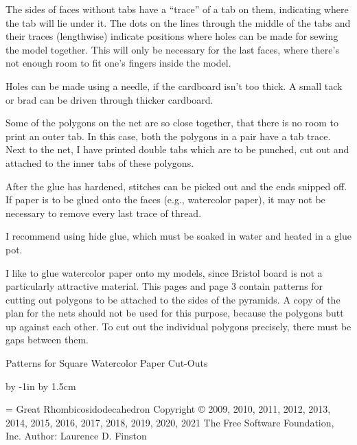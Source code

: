 The sides of faces without tabs have a ``trace'' of a tab on them,
indicating where the tab will lie under it.  The dots on the lines
through the middle of the tabs and their traces (lengthwise) indicate
positions where holes can be made for sewing the model together.  This
will only be necessary for the last faces, where there's not enough
room to fit one's fingers inside the model.  

Holes can be made using a needle, if the cardboard isn't too thick.
A small tack or brad can be driven through thicker cardboard.

Some of the polygons on the net are so close together, that there is no room
to print an outer tab.  In this case, both the polygons in a pair have a 
tab trace.  Next to the net, I have printed double tabs which are to be
punched, cut out and attached to the inner tabs of these polygons.

After the glue has hardened, stitches can be picked out and the ends
snipped off.  If paper is to be glued onto the faces (e.g., watercolor
paper), it may not be necessary to remove every last trace of thread.

I recommend using hide glue, which must be soaked in water and heated
in a glue pot.

I like to glue watercolor paper onto my models, since Bristol board is
not a particularly attractive material.  This pages and page 3 contain 
patterns for cutting out polygons to be attached to the sides of the pyramids.
A copy of the plan for the nets should not be used for this purpose, because
the polygons butt up against each other.  To cut out the individual 
polygons precisely, there must be gaps between them.
\par
\endgroup

\baselineskip
\centerline{{\largebx Patterns for Square Watercolor Paper Cut-Outs}}
\baselineskip
{}

\vfil\eject


\advance\hoffset by -1in
\advance\hoffset by 1.5cm




\headline={\hskip 2cm Great Rhombicosidodecahedron\quad %
           Copyright {\copyright} 2009, 2010, 2011, 2012, 2013, 2014, 2015, 2016, 2017, 2018, 2019, 2020, 2021 The Free Software Foundation, Inc.\hfil %
           \folio\hfil Author:  Laurence D. Finston\hfil}

